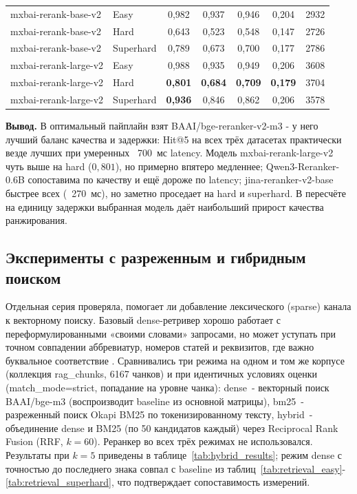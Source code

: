 \documentclass[a4paper,12pt]{article}
\begin{document}
\begin{table}[H]
{\begin{tabular}{ll|ccccc}
mxbai-rerank-base-v2 & Easy & 0,982 & 0,937 & 0,946 & 0,204 & 2932 \\
mxbai-rerank-base-v2 & Hard & 0,643 & 0,523 & 0,548 & 0,147 & 2726 \\
mxbai-rerank-base-v2 & Superhard & 0,789 & 0,673 & 0,700 & 0,177 & 2786 \\
mxbai-rerank-large-v2 & Easy & 0,988 & 0,935 & 0,949 & 0,206 & 3608 \\
mxbai-rerank-large-v2 & Hard & \textbf{0,801} & \textbf{0,684} & \textbf{0,709} & \textbf{0,179} & 3704 \\
mxbai-rerank-large-v2 & Superhard & \textbf{0,936} & 0,846 & 0,862 & 0,206 & 3578 \\
\hline
\end{tabular}%
}
\end{table}
\FloatBarrier

\textbf{Вывод.} В оптимальный пайплайн взят BAAI/bge-reranker-v2-m3 - у него лучший баланс качества и задержки: Hit@5 на всех трёх датасетах практически везде лучших при умеренных ~700~мс latency. Модель mxbai-rerank-large-v2 чуть выше на hard ($0{,}801$), но примерно впятеро медленнее; Qwen3-Reranker-0.6B сопоставима по качеству и ещё дороже по latency; jina-reranker-v2-base быстрее всех (~270~мс), но заметно проседает на hard и superhard. В пересчёте на единицу задержки выбранная модель даёт наибольший прирост качества ранжирования.

\subsection{Эксперименты с разреженным и гибридным поиском}
\label{sec:hybrid}

Отдельная серия проверяла, помогает ли добавление лексического (sparse) канала к векторному поиску. Базовый dense-ретривер хорошо работает с переформулированными «своими словами» запросами, но может уступать при точном совпадении аббревиатур, номеров статей и реквизитов, где важно буквальное соответствие \cite{robertson1994okapi}. Сравнивались три режима на одном и том же корпусе (коллекция rag\_chunks, 6167 чанков) и при идентичных условиях оценки (match\_mode=strict, попадание на уровне чанка): dense~- векторный поиск BAAI/bge-m3 (воспроизводит baseline из основной матрицы), bm25~- разреженный поиск Okapi BM25 по токенизированному тексту, hybrid~- объединение dense и BM25 (по 50 кандидатов каждый) через Reciprocal Rank Fusion (RRF, $k=60$). Реранкер во всех трёх режимах не использовался. Результаты при $k=5$ приведены в таблице~\ref{tab:hybrid_results}; режим dense с точностью до последнего знака совпал с baseline из таблиц~\ref{tab:retrieval_easy}-\ref{tab:retrieval_superhard}, что подтверждает сопоставимость измерений.
\end{document}
